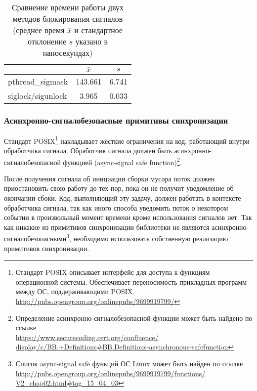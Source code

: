 \begin{table}[h!]
\caption{Сравнение времени работы двух методов блокирования сигналов (среднее время $\bar{x}$ 
и стандартное отклонение $s$ указано в наносекундах)}
\label{table:siglock}
\begin{center}
\begin{tabular}{|l|c|c|}
\hline
                            & $\bar{x}$    & $s$       \\ \hline
pthread\_sigmask            & 143.661      & 6.741     \\ \hline
siglock/sigunlock           & 3.965        & 0.033     \\ \hline
\end{tabular}
\end{center}
\end{table}


\subsubsection{Асинхронно-сигналобезопасные примитивы синхронизации}
Стандарт POSIX\footnote{Стандарт POSIX описывает интерфейс для доступа к функциям 
операционной системы. 
Обеспечивает переносимость прикладных программ между ОС, поддерживающими POSIX. \\
\url{http://pubs.opengroup.org/onlinepubs/9699919799/}} 
накладывает жёсткие ограничения на код, работающий внутри обработчика сигнала. 
Обработчик сигнала должен быть асинхронно-сигналобезопасной функцией 
(async-signal safe function)\footnote{Определение асинхронно-сигналобезопасной функции 
может быть найдено по ссылке\\ \url{https://www.securecoding.cert.org/confluence/
display/c/BB.+Definitions\#BB.Definitions-asynchronous-safefunction}}. 

После получения сигнала об инициации сборки мусора поток должен приостановить свою работу 
до тех пор, пока он не получит уведомление об окончании сбоки. 
Код, выполняющий эту задачу, должен работать в контексте обработчика сигнала, так как иного 
способа уведомить поток о некотором событии в произвольный момент времени кроме использования 
сигналов нет. 
Так как никакие из примитивов синхронизации библиотеки  не являются 
асинхронно-сигналобезопасными\footnote{Список async-signal safe функций ОС Linux может 
быть найден по ссылке\\ \url{http://pubs.opengroup.org/onlinepubs/9699919799/functions/
V2\_chap02.html\#tag\_15\_04\_03}}, 
необходимо использовать собственную реализацию примитивов синхронизации.

